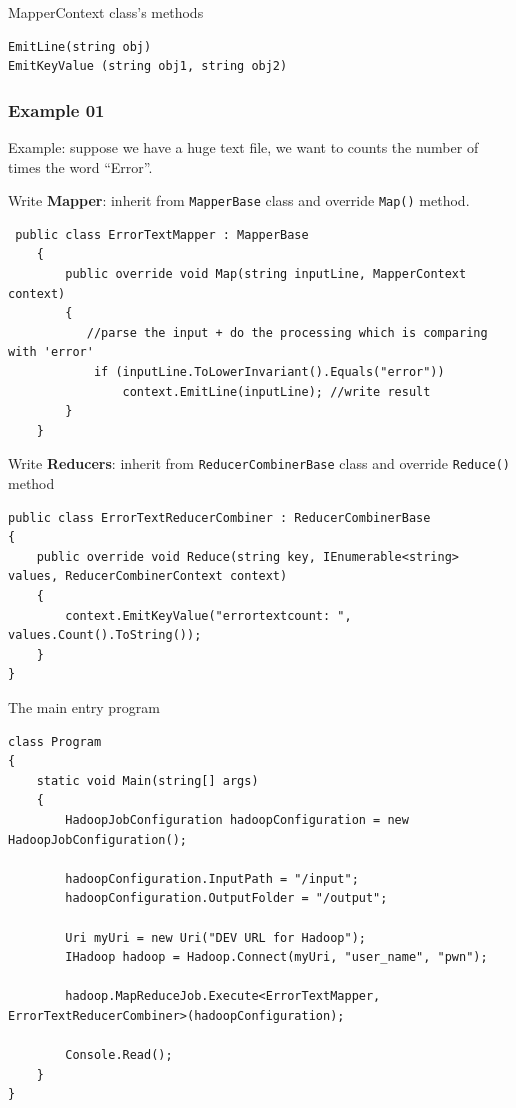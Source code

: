 MapperContext class's methods
\begin{verbatim}
EmitLine(string obj)
EmitKeyValue (string obj1, string obj2)
\end{verbatim}



\subsubsection{Example 01 }

Example: suppose we have a huge text file, we want to counts the number of times
the word ``Error''.  

Write {\bf Mapper}: inherit from \verb!MapperBase! class and override
\verb!Map()! method. 
\begin{verbatim}
 public class ErrorTextMapper : MapperBase
    {
        public override void Map(string inputLine, MapperContext context)
        {
           //parse the input + do the processing which is comparing with 'error'
            if (inputLine.ToLowerInvariant().Equals("error"))
                context.EmitLine(inputLine); //write result
        }
    }
\end{verbatim}


Write {\bf Reducers}: inherit from \verb!ReducerCombinerBase! class and
override \verb!Reduce()! method
\begin{verbatim}
public class ErrorTextReducerCombiner : ReducerCombinerBase
{
    public override void Reduce(string key, IEnumerable<string> values, ReducerCombinerContext context)
    {
        context.EmitKeyValue("errortextcount: ", values.Count().ToString());
    }
}
\end{verbatim}

The main entry program
\begin{verbatim}
class Program
{
    static void Main(string[] args)
    {
        HadoopJobConfiguration hadoopConfiguration = new HadoopJobConfiguration();
        
        hadoopConfiguration.InputPath = "/input";
        hadoopConfiguration.OutputFolder = "/output";
        
        Uri myUri = new Uri("DEV URL for Hadoop");
        IHadoop hadoop = Hadoop.Connect(myUri, "user_name", "pwn");
 
        hadoop.MapReduceJob.Execute<ErrorTextMapper, ErrorTextReducerCombiner>(hadoopConfiguration);
 
        Console.Read();
    }
}
\end{verbatim}

